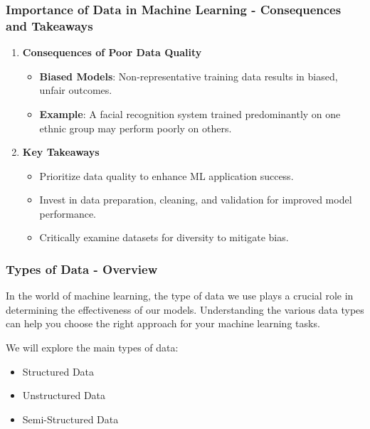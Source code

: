 \documentclass[aspectratio=169]{beamer}
\begin{document}
\begin{frame}[fragile]
    \frametitle{Importance of Data in Machine Learning - Consequences and Takeaways}
    \begin{enumerate}
        \item \textbf{Consequences of Poor Data Quality}
        \begin{itemize}
            \item \textbf{Biased Models}: Non-representative training data results in biased, unfair outcomes.
            \item \textbf{Example}: A facial recognition system trained predominantly on one ethnic group may perform poorly on others.
        \end{itemize}
        \item \textbf{Key Takeaways}
        \begin{itemize}
            \item Prioritize data quality to enhance ML application success.
            \item Invest in data preparation, cleaning, and validation for improved model performance.
            \item Critically examine datasets for diversity to mitigate bias.
        \end{itemize}
    \end{enumerate}
\end{frame}

\begin{frame}[fragile]
    \frametitle{Types of Data - Overview}
    In the world of machine learning, the type of data we use plays a crucial role in determining the effectiveness of our models. Understanding the various data types can help you choose the right approach for your machine learning tasks.
    
    We will explore the main types of data:
    \begin{itemize}
        \item Structured Data
        \item Unstructured Data
        \item Semi-Structured Data
    \end{itemize}
\end{frame}
\end{document}
